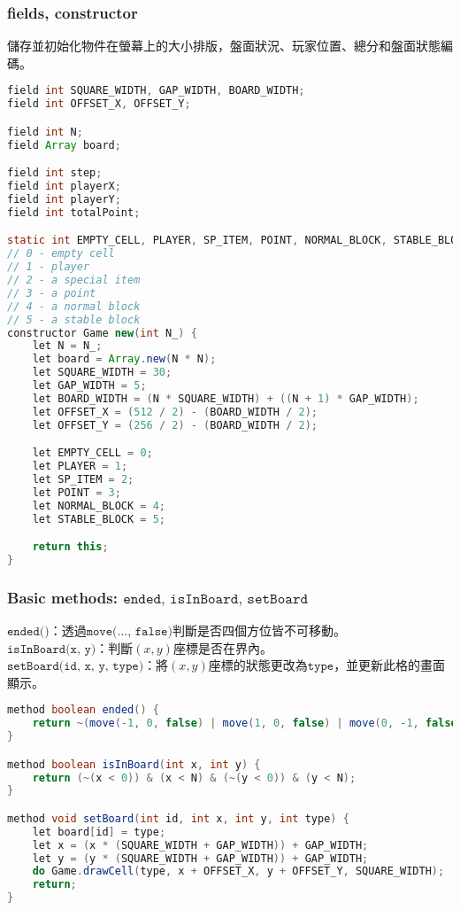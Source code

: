 \documentclass[pstricks, 12pt, a4paper]{article}
\begin{document}
    \subsubsection{fields, constructor}
      儲存並初始化物件在螢幕上的大小排版，盤面狀況、玩家位置、總分和盤面狀態編碼。
      \begin{lstlisting}[language=Java, frame=single]
field int SQUARE_WIDTH, GAP_WIDTH, BOARD_WIDTH;
field int OFFSET_X, OFFSET_Y;

field int N;
field Array board;

field int step;
field int playerX;
field int playerY;
field int totalPoint;

static int EMPTY_CELL, PLAYER, SP_ITEM, POINT, NORMAL_BLOCK, STABLE_BLOCK;
// 0 - empty cell
// 1 - player
// 2 - a special item
// 3 - a point
// 4 - a normal block
// 5 - a stable block
constructor Game new(int N_) {
    let N = N_;
    let board = Array.new(N * N);
    let SQUARE_WIDTH = 30;
    let GAP_WIDTH = 5;
    let BOARD_WIDTH = (N * SQUARE_WIDTH) + ((N + 1) * GAP_WIDTH);
    let OFFSET_X = (512 / 2) - (BOARD_WIDTH / 2);
    let OFFSET_Y = (256 / 2) - (BOARD_WIDTH / 2);

    let EMPTY_CELL = 0;
    let PLAYER = 1;
    let SP_ITEM = 2;
    let POINT = 3;
    let NORMAL_BLOCK = 4;
    let STABLE_BLOCK = 5;

    return this;
}
      \end{lstlisting}
    \subsubsection{Basic methods: $\texttt{ended, isInBoard, setBoard}$}
      \noindent $\texttt{ended()}$：透過$\texttt{move(..., false)}$判斷是否四個方位皆不可移動。\\
      $\texttt{isInBoard(x, y)}$：判斷$(x, y)$座標是否在界內。\\
      $\texttt{setBoard(id, x, y, type)}$：將$(x, y)$座標的狀態更改為$\texttt{type}$，並更新此格的畫面顯示。
      \begin{lstlisting}[language=Java, frame=single]
method boolean ended() {
    return ~(move(-1, 0, false) | move(1, 0, false) | move(0, -1, false) | move(0, 1, false));
}

method boolean isInBoard(int x, int y) {
    return (~(x < 0)) & (x < N) & (~(y < 0)) & (y < N);
}

method void setBoard(int id, int x, int y, int type) {
    let board[id] = type;
    let x = (x * (SQUARE_WIDTH + GAP_WIDTH)) + GAP_WIDTH;
    let y = (y * (SQUARE_WIDTH + GAP_WIDTH)) + GAP_WIDTH;
    do Game.drawCell(type, x + OFFSET_X, y + OFFSET_Y, SQUARE_WIDTH);
    return;
}
      \end{lstlisting}
\end{document}

